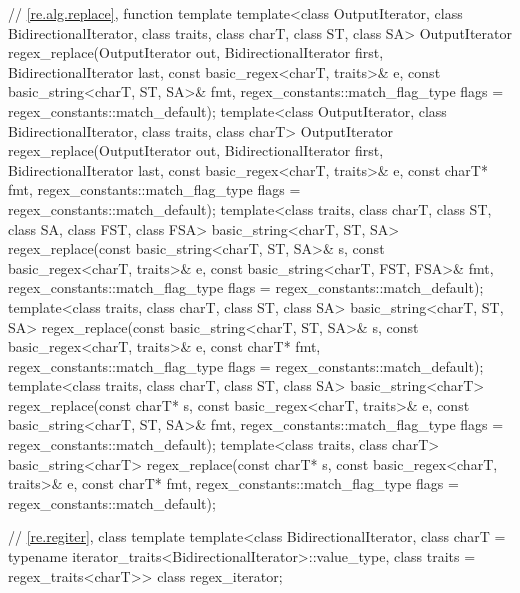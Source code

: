 \begin{codeblock}
{  // \ref{re.alg.replace}, function template 
  template<class OutputIterator, class BidirectionalIterator,
            class traits, class charT, class ST, class SA>
    OutputIterator
      regex_replace(OutputIterator out,
                    BidirectionalIterator first, BidirectionalIterator last,
                    const basic_regex<charT, traits>& e,
                    const basic_string<charT, ST, SA>& fmt,
                    regex_constants::match_flag_type flags = regex_constants::match_default);
  template<class OutputIterator, class BidirectionalIterator, class traits, class charT>
    OutputIterator
      regex_replace(OutputIterator out,
                    BidirectionalIterator first, BidirectionalIterator last,
                    const basic_regex<charT, traits>& e,
                    const charT* fmt,
                    regex_constants::match_flag_type flags = regex_constants::match_default);
  template<class traits, class charT, class ST, class SA, class FST, class FSA>
    basic_string<charT, ST, SA>
      regex_replace(const basic_string<charT, ST, SA>& s,
                    const basic_regex<charT, traits>& e,
                    const basic_string<charT, FST, FSA>& fmt,
                    regex_constants::match_flag_type flags = regex_constants::match_default);
  template<class traits, class charT, class ST, class SA>
    basic_string<charT, ST, SA>
      regex_replace(const basic_string<charT, ST, SA>& s,
                    const basic_regex<charT, traits>& e,
                    const charT* fmt,
                    regex_constants::match_flag_type flags = regex_constants::match_default);
  template<class traits, class charT, class ST, class SA>
    basic_string<charT>
      regex_replace(const charT* s,
                    const basic_regex<charT, traits>& e,
                    const basic_string<charT, ST, SA>& fmt,
                    regex_constants::match_flag_type flags = regex_constants::match_default);
  template<class traits, class charT>
    basic_string<charT>
      regex_replace(const charT* s,
                    const basic_regex<charT, traits>& e,
                    const charT* fmt,
                    regex_constants::match_flag_type flags = regex_constants::match_default);

  // \ref{re.regiter}, class template 
  template<class BidirectionalIterator,
            class charT = typename iterator_traits<BidirectionalIterator>::value_type,
            class traits = regex_traits<charT>>
    class regex_iterator;

}
\end{codeblock}
